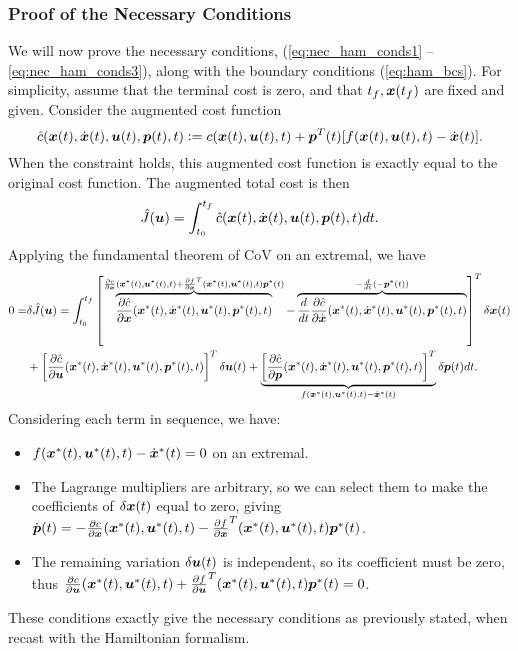 \subsubsection{Proof of the Necessary Conditions}

We will now prove the necessary conditions, (\ref{eq:nec_ham_conds1} -- \ref{eq:nec_ham_conds3}), along with the boundary conditions (\ref{eq:ham_bcs}). For simplicity, assume that the terminal cost is zero, and that $t_f, \bm{x}(t_f)$ are fixed and given. Consider the augmented cost function 
\begin{equation}
\hat{c}(\bm{x}(t), \dot{\bm{x}}(t), \bm{u}(t), \bm{p}(t),t) \vcentcolon= c(\bm{x}(t),\bm{u}(t),t) + \bm{p}^T(t) [f(\bm{x}(t),\bm{u}(t),t) - \dot{\bm{x}}(t)].
\end{equation}
When the constraint holds, this augmented cost function is exactly equal to the original cost function. The augmented total cost is then
\begin{equation}
    \hat{J}(\bm{u}) = \int_{t_0}^{t_f} \hat{c}(\bm{x}(t), \dot{\bm{x}}(t), \bm{u}(t), \bm{p}(t),t) dt.
\end{equation}
Applying the fundamental theorem of CoV on an extremal, we have
\begin{align}
    0 = &\delta \hat{J}(\bm{u}) = \int_{t_0}^{t_f} \left[ \overbrace{\frac{\partial \hat{c}}{\partial \bm{x}}(\bm{x}^*(t), \dot{\bm{x}}^*(t), \bm{u}^*(t), \bm{p}^*(t),t)}^{\frac{\partial c}{\partial \bm{x}}(\bm{x}^*(t),  \bm{u}^*(t), t) + \frac{\partial f}{\partial \bm{x}}^T(\bm{x}^*(t),  \bm{u}^*(t), t)\bm{p}^*(t)} - \overbrace{\frac{d}{dt} \frac{\partial \hat{c}}{\partial \dot{\bm{x}}}(\bm{x}^*(t), \dot{\bm{x}}^*(t), \bm{u}^*(t), \bm{p}^*(t),t)}^{-\frac{d}{dt}(-\bm{p}^*(t))} \right]^T \delta \bm{x}(t) \\
    & + \left[ \frac{\partial \hat{c}}{\partial \bm{u}}(\bm{x}^*(t), \dot{\bm{x}}^*(t), \bm{u}^*(t), \bm{p}^*(t),t)\right]^T \delta \bm{u}(t) + \underbrace{\left[\frac{\partial \hat{c}}{\partial \bm{p}}(\bm{x}^*(t), \dot{\bm{x}}^*(t), \bm{u}^*(t), \bm{p}^*(t),t) \right]^T }_{f(\bm{x}^*(t),\bm{u}^*(t),t) - \dot{\bm{x}}^*(t)} \delta \bm{p}(t) dt \nonumber.
\end{align}
Considering each term in sequence, we have:
\begin{itemize}
    \item $f(\bm{x}^*(t),\bm{u}^*(t),t) - \dot{\bm{x}}^*(t) = 0$ on an extremal.
    \item The Lagrange multipliers are arbitrary, so we can select them to make the coefficients of $\delta \bm{x}(t)$ equal to zero, giving $\dot{\bm{p}}(t) = -\frac{\partial c}{\partial \bm{x}}(\bm{x}^*(t),  \bm{u}^*(t), t) - \frac{\partial f}{\partial \bm{x}}^T(\bm{x}^*(t),  \bm{u}^*(t), t)\bm{p}^*(t)$.
    \item The remaining variation $\delta \bm{u}(t)$ is independent, so its coefficient must be zero, thus $ \frac{\partial c}{\partial \bm{u}}(\bm{x}^*(t),  \bm{u}^*(t), t) + \frac{\partial f}{\partial \bm{u}}^T(\bm{x}^*(t),  \bm{u}^*(t), t)\bm{p}^*(t) = 0$.
\end{itemize}
These conditions exactly give the necessary conditions as previously stated, when recast with the Hamiltonian formalism.

